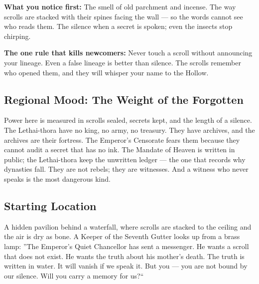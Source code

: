 \vspace{1em}

\begin{tcolorbox}[colback=black!3,colframe=blue!60!black,title={Theme \& Atmosphere},breakable]
\textbf{What you notice first:} The smell of old parchment and incense. The way scrolls are stacked with their spines facing the wall --- so the words cannot see who reads them. The silence when a secret is spoken; even the insects stop chirping.

\textbf{The one rule that kills newcomers:} Never touch a scroll without announcing your lineage. Even a false lineage is better than silence. The scrolls remember who opened them, and they will whisper your name to the Hollow.
\end{tcolorbox}

\subsection*{Regional Mood: The Weight of the Forgotten}

Power here is measured in scrolls sealed, secrets kept, and the length of a silence. The Lethai-thora have no king, no army, no treasury. They have archives, and the archives are their fortress. The Emperor's Censorate fears them because they cannot audit a secret that has no ink. The Mandate of Heaven is written in public; the Lethai-thora keep the unwritten ledger --- the one that records why dynasties fall. They are not rebels; they are witnesses. And a witness who never speaks is the most dangerous kind.

\subsection*{Starting Location}

A hidden pavilion behind a waterfall, where scrolls are stacked to the ceiling and the air is dry as bone. A Keeper of the Seventh Gutter looks up from a brass lamp: ''The Emperor's Quiet Chancellor has sent a messenger. He wants a scroll that does not exist. He wants the truth about his mother's death. The truth is written in water. It will vanish if we speak it. But you --- you are not bound by our silence. Will you carry a memory for us?``

